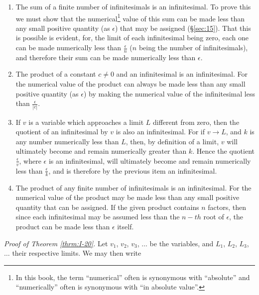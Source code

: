 \begin{enumerate}
\item
The sum of a finite number of infinitesimals is an 
infinitesimal. To prove this we must show that the 
numerical\footnote{In this book, the term ``numerical''
often is synonymous with ``absolute'' and  ``numerically''
often is synonymous with ``in absolute value''.}
value of this sum can be made less than any small positive 
quantity (as $\epsilon$) that may be assigned 
(\S \ref {sec:15}). That this is possible 
is evident, for, the limit of each infinitesimal being zero, 
each one can be made numerically less than $\frac{\epsilon}{n}$ 
($n$ being the number of infinitesimals), and therefore their sum 
can be made numerically less than $\epsilon$.

\item
The product of a constant $c\not= 0$ and an infinitesimal is an infinitesimal. 
For the numerical value of the product can always be made less 
than any small positive quantity (as $\epsilon$) by making the numerical 
value of the infinitesimal less than $\frac{\epsilon}{|c|}$.

\item
If $v$ is a variable which approaches a limit $L$ different from zero, 
then the quotient of an infinitesimal by $v$ is also an 
infinitesimal. For if %
$v\to L$, %
and $k$ is any number numerically 
less than $L$, then, by definition of a limit, $v$ will ultimately become 
and remain numerically greater than $k$. Hence the quotient 
$\frac{\epsilon}{v}$, where $\epsilon$ is an infinitesimal, will ultimately 
become and remain numerically less than $\frac{\epsilon}{k}$, and is 
therefore by %
the previous item
an infinitesimal.

\item
The product of any finite number of infinitesimals is an 
infinitesimal. For the numerical value of the product may be 
made less than any small positive quantity that can be assigned. 
If the given product contains $n$ factors, then since each 
infinitesimal may be assumed less than the $n-th$ root of $\epsilon$, the 
product can be made less than $\epsilon$ itself.


\end{enumerate}

{\it Proof of Theorem \ref{thrm:I-20}.} 
Let $v_1$, $v_2$, $v_3$, $\dots$ be the variables, and 
$L_1$, $L_2$, $L_3$, $\dots$ their respective limits. We may then write

